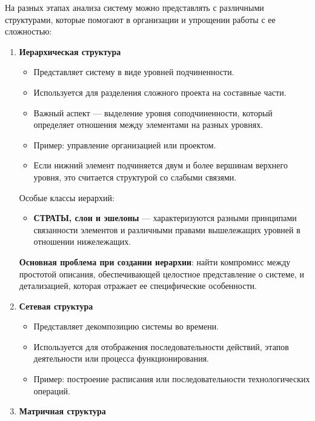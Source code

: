 \documentclass[
]{article}
\providecommand{\tightlist}{%
  \setlength{\itemsep}{0pt}\setlength{\parskip}{0pt}}
\begin{document}
На разных этапах анализа систему можно представлять с различными
структурами, которые помогают в организации и упрощении работы с ее
сложностью:

\begin{enumerate}
\def\labelenumi{\arabic{enumi}.}
\item
  \textbf{Иерархическая структура}

  \begin{itemize}
  \tightlist
  \item
    Представляет систему в виде уровней подчиненности.
  \item
    Используется для разделения сложного проекта на составные части.
  \item
    Важный аспект --- выделение уровня соподчиненности, который
    определяет отношения между элементами на разных уровнях.
  \item
    Пример: управление организацией или проектом.
  \item
    Если нижний элемент подчиняется двум и более вершинам верхнего
    уровня, это считается структурой со слабыми связями.
  \end{itemize}

  Особые классы иерархий:

  \begin{itemize}
  \tightlist
  \item
    \textbf{СТРАТЫ, слои и эшелоны} --- характеризуются разными
    принципами связанности элементов и различными правами вышележащих
    уровней в отношении нижележащих.
  \end{itemize}

  \textbf{Основная проблема при создании иерархии}: найти компромисс
  между простотой описания, обеспечивающей целостное представление о
  системе, и детализацией, которая отражает ее специфические
  особенности.
\item
  \textbf{Сетевая структура}

  \begin{itemize}
  \tightlist
  \item
    Представляет декомпозицию системы во времени.
  \item
    Используется для отображения последовательности действий, этапов
    деятельности или процесса функционирования.
  \item
    Пример: построение расписания или последовательности технологических
    операций.
  \end{itemize}
\item
  \textbf{Матричная структура}


\end{enumerate}
\end{document}
